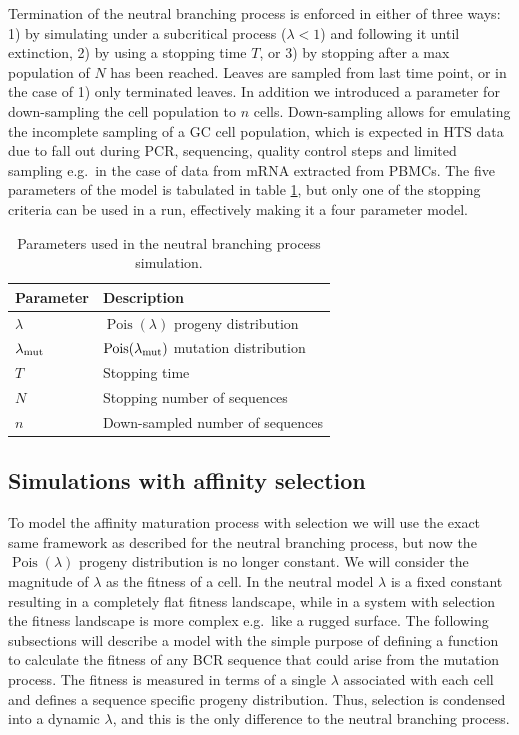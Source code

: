Termination of the neutral branching process is enforced in either of three ways: 1) by simulating under a subcritical process ($\lambda < 1$) \cite{gwp} and following it until extinction, 2) by using a stopping time $T$, or 3) by stopping after a max population of $N$ has been reached.
Leaves are sampled from last time point, or in the case of 1) only terminated leaves.
In addition we introduced a parameter for down-sampling the cell population to $n$ cells.
Down-sampling allows for emulating the incomplete sampling of a GC cell population, which is expected in HTS data due to fall out during PCR, sequencing, quality control steps and limited sampling e.g.\ in the case of data from mRNA extracted from PBMCs.
The five parameters of the model is tabulated in table \ref{neut_constants}, but only one of the stopping criteria can be used in a run, effectively making it a four parameter model.

\begin{table}[ht]
\centering
\begin{tabular}{ll}
Parameter    & Description \\ \hline
$\lambda$ & $\operatorname{Pois}(\lambda)$ progeny distribution \\
$\lambda_{\text{mut}}$ & $\operatorname{Pois}(\lambda_{\text{mut}})$ mutation distribution \\
$T$ & Stopping time \\
$N$ & Stopping number of sequences \\
$n$ & Down-sampled number of sequences
\end{tabular}
\caption{
\label{neut_constants}
    Parameters used in the neutral branching process simulation.}
\end{table}






\subsection{Simulations with affinity selection}
To model the affinity maturation process with selection we will use the exact same framework as described for the neutral branching process, but now the $\operatorname{Pois}(\lambda)$ progeny distribution is no longer constant.
We will consider the magnitude of $\lambda$ as the fitness of a cell.
In the neutral model $\lambda$ is a fixed constant resulting in a completely flat fitness landscape, while in a system with selection the fitness landscape is more complex e.g.\ like a rugged surface.
The following subsections will describe a model with the simple purpose of defining a function to calculate the fitness of any BCR sequence that could arise from the mutation process.
The fitness is measured in terms of a single $\lambda$ associated with each cell and defines a sequence specific progeny distribution.
Thus, selection is condensed into a dynamic $\lambda$, and this is the only difference to the neutral branching process.




